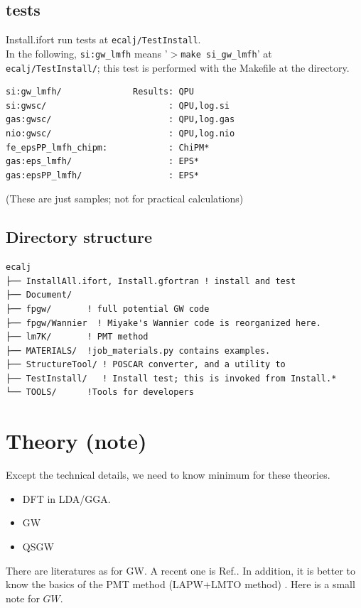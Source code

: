\subsection{tests}
Install.ifort run tests at \verb#ecalj/TestInstall#.\\
In the following, \verb#si:gw_lmfh# means '$>$\verb#make si_gw_lmfh#'
at \verb#ecalj/TestInstall/#; this test is performed with the Makefile
at the directory. 
\begin{verbatim}
si:gw_lmfh/              Results: QPU 
si:gwsc/                        : QPU,log.si
gas:gwsc/                       : QPU,log.gas
nio:gwsc/                       : QPU,log.nio
fe_epsPP_lmfh_chipm:            : ChiPM* 
gas:eps_lmfh/                   : EPS*
gas:epsPP_lmfh/                 : EPS*
\end{verbatim}
(These are just samples; not for practical calculations)

\subsection{Directory structure}
{\baselineskip=1mm
\begin{verbatim}
ecalj
├── InstallAll.ifort, Install.gfortran ! install and test
├── Document/
├── fpgw/       ! full potential GW code
├── fpgw/Wannier  ! Miyake's Wannier code is reorganized here.
├── lm7K/       ! PMT method 
├── MATERIALS/  !job_materials.py contains examples. 
├── StructureTool/ ! POSCAR converter, and a utility to 
├── TestInstall/   ! Install test; this is invoked from Install.*
└── TOOLS/      !Tools for developers
\end{verbatim}
}


\newpage
\section{Theory (note)}
Except the technical details, we need to know minimum for these theories.
\begin{itemize}
\item DFT in LDA/GGA.
\item GW
\item QSGW
\end{itemize}
There are literatures as for GW. A recent one is 
Ref.\cite{di_valentin_quasiparticle_2014}.
In addition, it is better to know the basics of the PMT
method (LAPW+LMTO method)
\cite{kotani2015pmt}. 
Here is a small note for $GW$.\\

